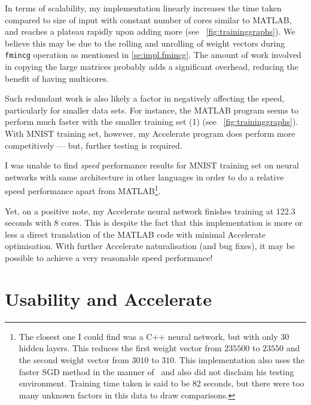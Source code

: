 
In terms of scalability, my implementation linearly increases the time taken compared to size of input with constant number of cores similar to MATLAB, and reaches a plateau rapidly upon adding more (see ~\ref{fig:traininggraphs}). We believe this may be due to the rolling and unrolling of weight vectors during \texttt{fmincg} operation as mentioned in \ref{se:impl.fmincg}. The amount of work involved in copying the large matrices probably adds a significant overhead, reducing the benefit of having multicores.

Such redundant work is also likely a factor in negatively affecting the speed, particularly for smaller data sets. For instance, the MATLAB program seems to perform much faster with the smaller training set (1) (see ~\ref{fig:traininggraphs}). With MNIST training set, however, my Accelerate program does perform more competitively --- but, further testing is required. 

I was unable to find \textit{speed} performance results for MNIST training set on neural networks with same architecture in other languages in order to do a relative speed performance apart from MATLAB\footnote{The closest one I could find was a C++ neural network\cite{Wol17}, but with only 30 hidden layers. This reduces the first weight vector from $235500$ to $23550$ and the second weight vector from $3010$ to $310$. This implementation also uses the faster SGD method in the manner of~\cite{LeC98} and also did not disclaim his testing environment. Training time taken is said to be 82 seconds, but there were too many unknown factors in this data to draw comparisons.}.

Yet, on a positive note, my Accelerate neural network finishes training at 122.3 seconds with 8 cores. This is despite the fact that this implementation is more or less a direct translation of the MATLAB code with minimal Accelerate optimisation. With further Accelerate naturalisation (and bug fixes), it may be possible to achieve a very reasonable speed performance!

\section{Usability and Accelerate} \label{se:eval.usability}

